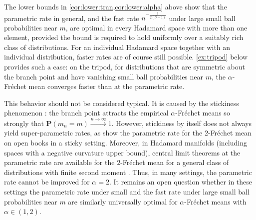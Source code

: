 \documentclass{article}
\renewcommand{\Pr}{\mathbf{P}} %
\newcommand{\Prof}[1]{\Pr(#1)}
\begin{document}
\begin{remark}
    The lower bounds in \cref{cor:lower:tran,cor:lower:alpha} above show that the parametric rate in general, and the
    fast rate $n^{-\frac{1}{2(\beta-1)}}$ under large small ball probabilities
    near $m$, are optimal in every Hadamard space with more than one element,
    provided the bound is required to hold uniformly over a suitably rich class of distributions.
    For an individual Hadamard space together with an individual distribution,
    faster rates are of course still possible. \cref{ex:tripod} below provides
    such a case: on the tripod, for distributions that are symmetric about the
    branch point and have vanishing small ball probabilities near $m$, the
    $\alpha$-Fr\'echet mean converges faster than at the parametric rate.
    
    This behavior should not be considered typical. It is caused by the
    stickiness phenomenon \cite{Hotz2013,Huckemann2015}: the branch point
    attracts the empirical $\alpha$-Fr\'echet means so strongly that
    $\Prof{m_n = m} \xrightarrow{n\to\infty} 1$. However, stickiness by itself does
    not always yield super-parametric rates, as \cite{Hotz2013} show the
    parametric rate for the $2$-Fr\'echet mean on open books in a sticky setting.
    Moreover, in Hadamard manifolds (including spaces with a negative curvature upper bound), central limit theorems at the parametric
    rate are available for the $2$-Fr\'echet mean for a general class of
    distributions with finite second moment
    \cite{Bhattacharya2005,Bhattacharya2017}. 
    Thus, in many settings, the parametric rate cannot be improved for
    $\alpha=2$. It remains an open question whether in these settings the parametric rate under small and the fast rate under large small
    ball probabilities near $m$ are similarly universally optimal for
    $\alpha$-Fr\'echet means with $\alpha\in(1,2)$.
\end{remark}
\end{document}
